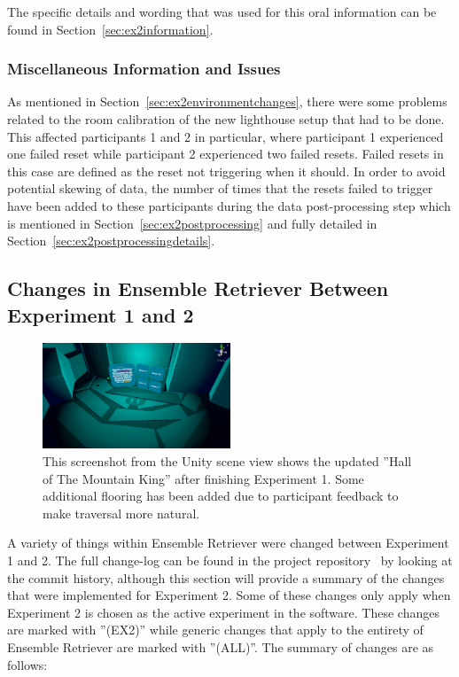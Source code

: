 The specific details and wording that was used for this oral information can be found in Section~\ref{sec:ex2information}.

\subsubsection{Miscellaneous Information and Issues}
As mentioned in Section~\ref{sec:ex2environmentchanges}, there were some problems related to the room calibration of the new lighthouse setup that had to be done. This affected participants 1 and 2 in particular, where participant 1 experienced one failed reset while participant 2 experienced two failed resets. Failed resets in this case are defined as the reset not triggering when it should. In order to avoid potential skewing of data, the number of times that the resets failed to trigger have been added to these participants during the data post-processing step which is mentioned in Section~\ref{sec:ex2postprocessing} and fully detailed in Section~\ref{sec:ex2postprocessingdetails}. 

\subsection{Changes in Ensemble Retriever Between Experiment 1 and 2}\label{sec:changesBetweenExperiments}
\begin{figure}[tbph]
    \centering
    \includegraphics[width=0.5\textwidth]{figures/screenshots/HallOfTheMountainKingWithNewFloor.png}
    \caption[Screenshot of the ''Hall of The Mountain King'' Post Experiment 1]{This screenshot from the Unity scene view shows the updated ''Hall of The Mountain King'' after finishing Experiment 1. Some additional flooring has been added due to participant feedback to make traversal more natural.}
    \label{fig:mkhallWithFloor}
\end{figure}

A variety of things within Ensemble Retriever were changed between Experiment 1 and 2. The full change-log can be found in the project repository~\cite{projectRepository} by looking at the commit history, although this section will provide a summary of the changes that were implemented for Experiment 2. Some of these changes only apply when Experiment 2 is chosen as the active experiment in the software. These changes are marked with ''(EX2)'' while generic changes that apply to the entirety of Ensemble Retriever are marked with ''(ALL)''. The summary of changes are as follows:


